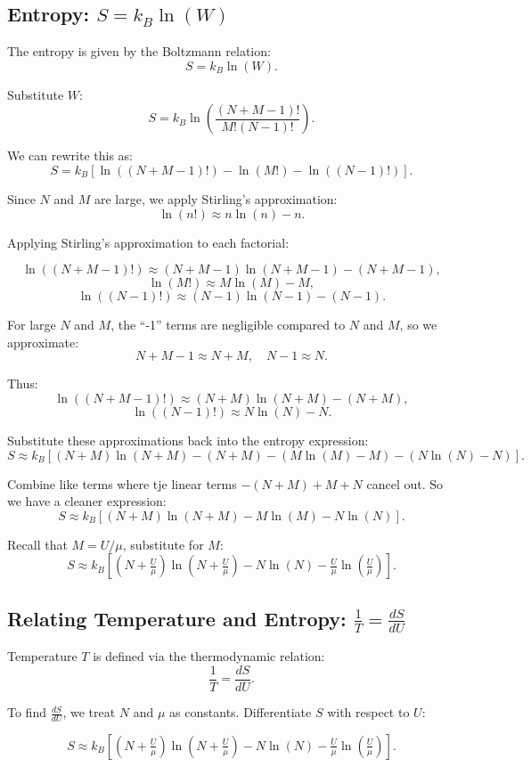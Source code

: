 \documentclass{article}
\begin{document}
\subsection*{Entropy: $S = k_B \ln(W)$}

The entropy is given by the Boltzmann relation:
\[
S = k_B \ln(W).
\]

Substitute $W$:
\[
S = k_B \ln\left(\frac{(N + M - 1)!}{M! (N - 1)!}\right).
\]

We can rewrite this as:
\[
S = k_B \left[ \ln((N + M - 1)!) - \ln(M!) - \ln((N-1)!) \right].
\]

Since $N$ and $M$ are large, we apply Stirling’s approximation:
\[
\ln(n!) \approx n \ln(n) - n.
\]

Applying Stirling’s approximation to each factorial:

\[
\ln((N+M-1)!) \approx (N + M - 1)\ln(N+M-1) - (N + M - 1),
\]
\[
\ln(M!) \approx M \ln(M) - M,
\]
\[
\ln((N-1)!) \approx (N-1)\ln(N-1) - (N-1).
\]

For large $N$ and $M$, the “-1” terms are negligible compared to $N$ and $M$, so we approximate:
\[
N + M - 1 \approx N + M, \quad N - 1 \approx N.
\]

Thus:
\[
\ln((N + M - 1)!) \approx (N + M) \ln(N + M) - (N + M),
\]
\[
\ln((N-1)!) \approx N \ln(N) - N.
\]

Substitute these approximations back into the entropy expression:
\[
S \approx k_B \left[ (N + M)\ln(N + M) - (N + M) - (M \ln(M) - M) - (N \ln(N) - N) \right].
\]

Combine like terms where tje linear terms $-(N+M) + M + N$ cancel out. So we have a cleaner expression:
\[
S \approx k_B \left[ (N + M)\ln(N + M) - M \ln(M) - N \ln(N) \right].
\]


Recall that $M = U/\mu$, substitute for $M$:
\[
S \approx k_B \left[ (N + \tfrac{U}{\mu})\ln\left(N + \tfrac{U}{\mu}\right) - N \ln(N) - \tfrac{U}{\mu}\ln\left(\tfrac{U}{\mu}\right) \right].
\]

\subsection*{Relating Temperature and Entropy: $\frac{1}{T} = \frac{dS}{dU}$}

Temperature $T$ is defined via the thermodynamic relation:
\[
\frac{1}{T} = \frac{dS}{dU}.
\]

To find $\frac{dS}{dU}$, we treat $N$ and $\mu$ as constants. Differentiate $S$ with respect to $U$:

\[
S \approx k_B \left[ (N + \tfrac{U}{\mu})\ln\left(N + \tfrac{U}{\mu}\right) - N \ln(N) - \tfrac{U}{\mu}\ln\left(\tfrac{U}{\mu}\right)\right].
\]
\end{document}

